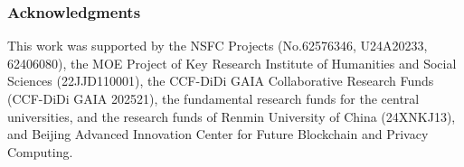 \documentclass[10pt]{article} %
\begin{document}
\subsubsection*{Acknowledgments}
This work was supported by the NSFC Projects (No.62576346, U24A20233, 62406080), the MOE Project of Key Research Institute of Humanities and Social Sciences (22JJD110001), the CCF-DiDi GAIA Collaborative Research Funds (CCF-DiDi GAIA 202521), the fundamental research funds for the central universities, and the research funds of Renmin University of China (24XNKJ13), and Beijing Advanced Innovation Center for Future Blockchain and Privacy Computing. 











\end{document}
